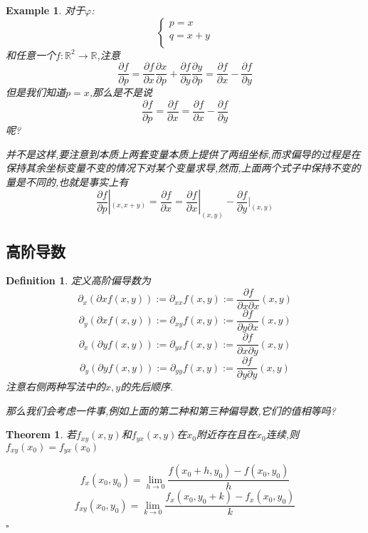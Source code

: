 \documentclass[11pt,hyperref,a4paper,UTF8]{ctexart}
\newtheorem{theorem}{Theorem}[subsection]
\newtheorem{example}{Example}[subsection]
\newtheorem{definition}{Definition}[subsection]
\newenvironment{cproof}{%
\heiti{证明}\kaishu
}{%
  \hfill $\square$
  \par\bigskip
}
\newcommand{\RR}{\mathbb{R}}
\begin{document}
\begin{CJK}{UTF8}{gkai}
\begin{example}
  对于$\varphi$: 
  \[\begin{cases}
    p = x\\
    q = x + y\\
  \end{cases}\]
  和任意一个$f: \RR^2 \to \RR$,注意
  \[\frac{\partial f }{\partial p} = \frac{\partial f }{\partial x} \frac{\partial x}{\partial p} + \frac{\partial f }{\partial y} \frac{\partial y}{\partial p} = \frac{\partial f }{\partial x} - \frac{\partial f }{\partial y}\]
  但是我们知道$p = x$,那么是不是说
  \[\frac{\partial f }{\partial p} = \frac{\partial f }{\partial x} = \frac{\partial f }{\partial x} - \frac{\partial f }{\partial y}\]
  呢?

  并不是这样,要注意到本质上两套变量本质上提供了两组坐标,而求偏导的过程是在保持其余坐标变量不变的情况下对某个变量求导,然而,上面两个式子中保持不变的量是不同的,也就是事实上有
  \[\frac{\partial f }{\partial p}|_{(x,x+y)} = \frac{\partial f }{\partial x} = \frac{\partial f }{\partial x}|_{(x,y)} - \frac{\partial f }{\partial y}|_{(x,y)}\]
\end{example}
\subsection{高阶导数}

\begin{definition}
  定义高阶偏导数为
  \[\partial_x(\partial x f(x,y)) := \partial_{xx}f(x,y) := \frac{\partial f}{\partial x \partial x}(x,y) \]
  \[\partial_y(\partial x f(x,y)) := \partial_{xy}f(x,y) := \frac{\partial f}{\partial y \partial x}(x,y) \]
  \[\partial_x(\partial y f(x,y)) := \partial_{yx}f(x,y) := \frac{\partial f}{\partial x \partial y}(x,y) \]
  \[\partial_y(\partial y f(x,y)) := \partial_{yy}f(x,y) := \frac{\partial f}{\partial y \partial y}(x,y) \]
  注意右侧两种写法中的$x,y$的先后顺序.

  那么我们会考虑一件事,例如上面的第二种和第三种偏导数,它们的值相等吗?
\end{definition}

\begin{theorem}
  若$f_{xy}(x,y)$和$f_{yx}(x,y)$在$x_0$附近存在且在$x_0$连续,则$f_{xy}(x_0) = f_{yx}(x_0)$
\end{theorem}

\begin{cproof}
  \[f_x(x_0,y_0) = \lim_{h\to 0}\frac{f(x_0 + h,y_0) - f(x_0,y_0)}{h}\]
  \[f_{xy}(x_0,y_0) = \lim_{k\to 0}\frac{f_x(x_0,y_0 + k) - f_x(x_0,y_0)}{k}\]


\end{cproof}
\end{CJK}
\end{document}
